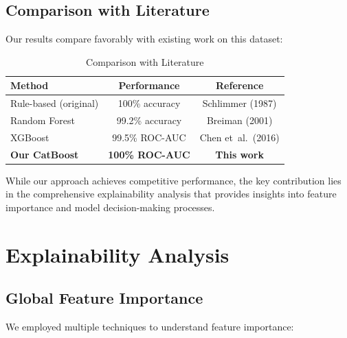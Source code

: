 \documentclass[11pt,a4paper]{article}
\begin{document}
\subsection{Comparison with Literature}

Our results compare favorably with existing work on this dataset:

\begin{table}[H]
\centering
\caption{Comparison with Literature}
\begin{tabular}{@{}lcc@{}}
\toprule
\textbf{Method} & \textbf{Performance} & \textbf{Reference} \\
\midrule
Rule-based (original) & 100\% accuracy & Schlimmer (1987) \\
Random Forest & 99.2\% accuracy & Breiman (2001) \\
XGBoost & 99.5\% ROC-AUC & Chen et~al.\ (2016) \\
\textbf{Our CatBoost} & \textbf{100\% ROC-AUC} & \textbf{This work} \\
\bottomrule
\end{tabular}
\end{table}

While our approach achieves competitive performance, the key contribution lies in the comprehensive explainability analysis that provides insights into feature importance and model decision-making processes.

\section{Explainability Analysis}
\label{sec:explainability}

\subsection{Global Feature Importance}

We employed multiple techniques to understand feature importance:
\end{document}
